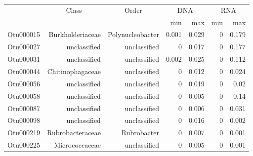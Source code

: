 \begin{table}[ht]
\centering
\begin{tabular}{crrrrrr}
  \hline
  & \multicolumn{1}{c}{Class} & \multicolumn{1}{c}{Order} & 
                      \multicolumn{2}{c}{DNA} & \multicolumn{2}{c}{RNA} \\
 & &  & min & max & min & max \\
 \hline
Otu000015 & Burkholderiaceae & Polynucleobacter & 0.001 & 0.029 & 0 & 0.179 \\ 
  Otu000027 & unclassified & unclassified & 0 & 0.017 & 0 & 0.177 \\ 
  Otu000031 & unclassified & unclassified & 0.002 & 0.025 & 0 & 0.112 \\ 
  Otu000044 & Chitinophagaceae & unclassified & 0 & 0.012 & 0 & 0.024 \\ 
  Otu000056 & unclassified & unclassified & 0 & 0.019 & 0 & 0.02 \\ 
  Otu000058 & unclassified & unclassified & 0 & 0.005 & 0 & 0.14 \\ 
  Otu000087 & unclassified & unclassified & 0 & 0.006 & 0 & 0.031 \\ 
  Otu000098 & unclassified & unclassified & 0 & 0.016 & 0 & 0.002 \\ 
  Otu000219 & Rubrobacteraceae & Rubrobacter & 0 & 0.007 & 0 & 0.001 \\ 
  Otu000225 & Micrococcaceae & unclassified & 0 & 0.005 & 0 & 0.001 \\ 
   \hline
\end{tabular}
\end{table}
